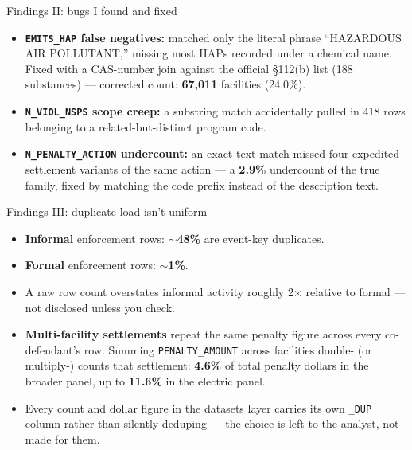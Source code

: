 \documentclass[aspectratio=169,11pt]{beamer}
\begin{document}
\begin{frame}{Findings II: bugs I found and fixed}
  \begin{itemize}
    \item \textbf{\texttt{EMITS\_HAP} false negatives:} matched only the literal phrase
      ``HAZARDOUS AIR POLLUTANT,'' missing most HAPs recorded under a chemical name. Fixed with a CAS-number
      join against the official \S112(b) list (188 substances) — corrected count: \textbf{67{,}011}
      facilities (24.0\%).
    \item \textbf{\texttt{N\_VIOL\_NSPS} scope creep:} a substring match accidentally pulled in 418 rows
      belonging to a related-but-distinct program code.
    \item \textbf{\texttt{N\_PENALTY\_ACTION} undercount:} an exact-text match missed four expedited
      settlement variants of the same action — a \textbf{2.9\%} undercount of the true family, fixed by
      matching the code prefix instead of the description text.
  \end{itemize}
\end{frame}

\begin{frame}{Findings III: duplicate load isn't uniform}
  \begin{itemize}
    \item \textbf{Informal} enforcement rows: $\sim$\textbf{48\%} are event-key duplicates.
    \item \textbf{Formal} enforcement rows: $\sim$\textbf{1\%}.
    \item A raw row count overstates informal activity roughly 2$\times$ relative to formal — not disclosed
      unless you check.
    \item \textbf{Multi-facility settlements} repeat the same penalty figure across every co-defendant's
      row. Summing \texttt{PENALTY\_AMOUNT} across facilities double- (or multiply-) counts that
      settlement: \textbf{4.6\%} of total penalty dollars in the broader panel, up to \textbf{11.6\%} in the
      electric panel.
    \item Every count and dollar figure in the datasets layer carries its own \texttt{\_DUP} column rather
      than silently deduping — the choice is left to the analyst, not made for them.
  \end{itemize}
\end{frame}
\end{document}
